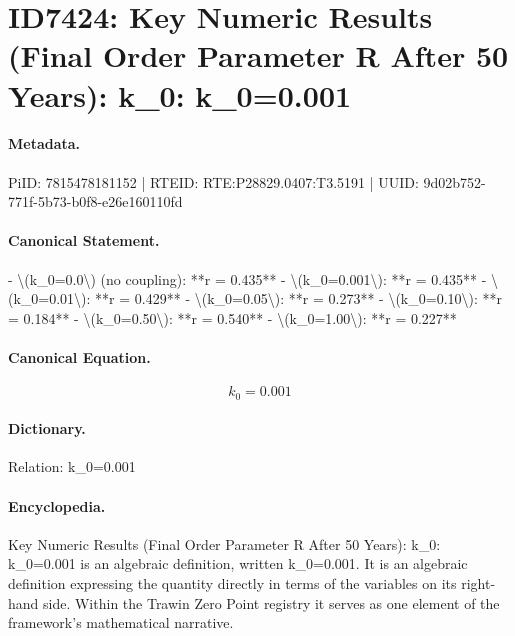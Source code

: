 \section*{ID7424: Key Numeric Results (Final Order Parameter R After 50 Years): k\_0: k\_0=0.001}
\paragraph{Metadata.}
PiID: 7815478181152 | RTEID: RTE:P28829.0407:T3.5191 | UUID: 9d02b752-771f-5b73-b0f8-e26e160110fd

\paragraph{Canonical Statement.}
- \textbackslash{}(k\_0=0.0\textbackslash{}) (no coupling): **r = 0.435** - \textbackslash{}(k\_0=0.001\textbackslash{}): **r = 0.435** - \textbackslash{}(k\_0=0.01\textbackslash{}): **r = 0.429** - \textbackslash{}(k\_0=0.05\textbackslash{}): **r = 0.273** - \textbackslash{}(k\_0=0.10\textbackslash{}): **r = 0.184** - \textbackslash{}(k\_0=0.50\textbackslash{}): **r = 0.540** - \textbackslash{}(k\_0=1.00\textbackslash{}): **r = 0.227**

\paragraph{Canonical Equation.}
\[
k_0=0.001
\]

\paragraph{Dictionary.}
Relation: k\_0=0.001

\paragraph{Encyclopedia.}
Key Numeric Results (Final Order Parameter R After 50 Years): k\_0: k\_0=0.001 is an algebraic definition, written k\_0=0.001. It is an algebraic definition expressing the quantity directly in terms of the variables on its right-hand side. Within the Trawin Zero Point registry it serves as one element of the framework's mathematical narrative.
